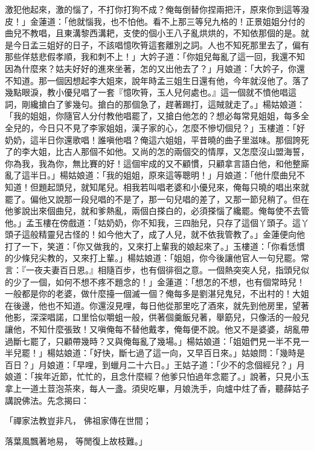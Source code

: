 激犯他起來，激的惱了，不打你打狗不成？俺每倒替你捏兩把汗，原來你到這等潑皮！」金蓮道：「他就惱我，也不怕他。看不上那三等兒九格的！正景姐姐分付的曲兒不教唱，且東溝黎西溝耙，支使的個小王八子亂烘烘的，不知依那個的是。就是今日孟三姐好的日子，不該唱憶吹筲這套離別之詞。人也不知死那里去了，偏有那些佯慈悲假孝順，我和刺不上！」大妗子道：「你姐兒每亂了這一回，我還不知因為什麼來？姑夫好好的進來坐著，怎的又出他去了？」月娘道：「大妗子，你還不知道。那一個因想起李大姐來，說年時孟三姐生日還有他，今年就沒他了。落了幾點眼淚，教小優兒唱了一套『憶吹筲，玉人兒何處也。』這一個就不憤他唱這詞，剛纔搶白了爹幾句。搶白的那個急了，趕著踢打，這賊就走了。」楊姑娘道：「我的姐姐，你隨官人分付教他唱罷了，又搶白他怎的？想必每常見姐姐，每多全全兒的，今日只不見了李家姐姐，漢子家的心，怎麼不慘切個兒？」玉樓道：「好奶奶，這半日你還歌唱！誰嗔他唱？俺這六姐姐，平昔曉的曲子里滋味。那個誇死了的李大姐，比古人那個不如他。又尚的怎的兩個交的情厚，又怎麼沒山盟海誓，你為我，我為你，無比賽的好！這個牢成的又不顧慣，只顧拿言語白他，和他整廝亂了這半日。」楊姑娘道：「我的姐姐，原來這等聰明！」月娘道：「他什麼曲兒不知道！但題起頭兒，就知尾兒。相我若叫唱老婆和小優兒來，俺每只曉的唱出來就罷了。偏他又說那一段兒唱的不是了，那一句兒唱的差了，又那一節兒稍了。但在他爹說出來個曲兒，就和爹熱亂，兩個白搽白的，必須搽惱了纔罷。俺每使不去管他。」孟玉樓在傍戲道：「姑奶奶，你不知我，三四胎兒，只存了這個丫頭子。這丫頭子這般精靈兒古怪的！如今他大了，成了人兒，就不依我管教了。」金蓮便向他打了一下，笑道：「你又做我的，又來打上輩我的娘起來了。」玉樓道：「你看恁慣的少條兒尖教的，又來打上輩。」楊姑娘道：「姐姐，你今後讓他官人一句兒罷。常言：『一夜夫妻百日恩。』相隨百步，也有個徘徊之意。一個熱突突人兒，指頭兒似的少了一個，如何不想不疼不題念的！」金蓮道：「想怎的不想，也有個常時兒！一般都是你的老婆，做什麼擡一個滅一個？俺每多是劉湛兒鬼兒，不出村的！大姐在後邊，他也不知道。你還沒見哩，每日他從那里吃了酒來，就先到他房里，望著他影，深深唱諾，口里恰似嚼蛆一般，供著個羹飯兒著，舉筯兒，只像活的一般兒讓他，不知什麼張致！又嗔俺每不替他戴孝，俺每便不說。他又不是婆婆，胡亂帶過斷七罷了，只顧帶幾時？又與俺每亂了幾場。」楊姑娘道：「姐姐們見一半不見一半兒罷！」楊姑娘道：「好快，斷七過了這一向，又早百日來。」姑娘問：「幾時是百日？」月娘道：「早哩，到蠟月二十六日。」王姑子道：「少不的念個經兒？」月娘道：「挨年近節，忙忙的，且念什麼經？他爹只怕過年念罷了。」說著，只見小玉拿上一道土荳泡茶來，每人一盞。須臾吃畢，月娘洗手，向爐中炷了香，聽薛姑子講說佛法。先念揭曰：

「禪家法教豈非凡，  佛祖家傳在世間；

落葉風飄著地易，  等閒復上故枝難。」


